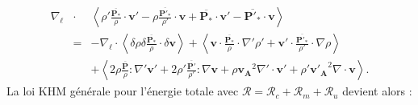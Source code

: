 \begin{eqnarray*}
\nabla_{\boldsymbol{\ell}} &\cdot& \left< \rho' \frac{ \overline{\boldsymbol{P_*}}}{\rho} \cdot \boldsymbol{v'} -  \rho \frac{\overline{\boldsymbol{P'_*}}}{\rho'} \cdot \boldsymbol{v}  +  \overline{\boldsymbol{P_*}} \cdot \boldsymbol{v'} -  \overline{\boldsymbol{P'_*}} \cdot \boldsymbol{v} \right>\\
&=& -\nabla_{\boldsymbol{\ell}} \cdot \left<\delta \rho \delta \frac{ \overline{\boldsymbol{P_*}} }{\rho} \cdot \delta \boldsymbol{v} \right> +  \left<   \boldsymbol{v}\cdot\frac{ \overline{\boldsymbol{P_*}} }{\rho} \cdot  \nabla'\rho' + \boldsymbol{v'} \cdot \frac{ \overline{\boldsymbol{P'_*}} }{\rho'} \cdot \nabla \rho  \right> \\
&&+ \left< 2 \rho  \frac{ \overline{\boldsymbol{P}} }{\rho} : \nabla'\boldsymbol{v'} + 2  \rho'\frac{ \overline{\boldsymbol{P'}} }{\rho'} : \nabla \boldsymbol{v}  + \rho \boldsymbol{v_A}^2 \nabla' \cdot \boldsymbol{v'} +   \rho' \boldsymbol{v'_A}^2 \nabla \cdot \boldsymbol{v}\right> .
\end{eqnarray*}
La loi \acs{KHM} générale pour l'énergie totale avec $\mathcal{R} = \mathcal{R}_{c} + \mathcal{R}_{m} + \mathcal{R}_{u}$ devient alors :
